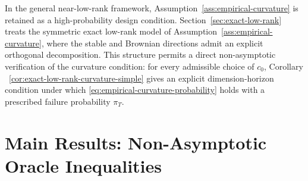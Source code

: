 \documentclass[11pt]{article}
\begin{document}
In the general near-low-rank framework, Assumption~\ref{ass:empirical-curvature} is retained as a high-probability design condition. Section~\ref{sec:exact-low-rank} treats the symmetric exact low-rank model of Assumption~\ref{ass:empirical-curvature}, where the stable and Brownian directions admit an explicit orthogonal decomposition. This structure permits a direct non-asymptotic verification of the curvature condition: for every admissible choice of $c_0$, Corollary ~\ref{cor:exact-low-rank-curvature-simple} gives an explicit dimension-horizon condition under which \eqref{eq:empirical-curvature-probability} holds with a prescribed failure probability $\pi_T$.




\section{Main Results: Non-Asymptotic Oracle Inequalities}
\label{sec:main-results}
\end{document}

